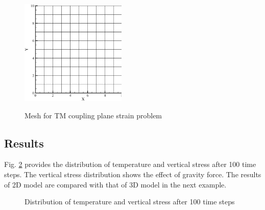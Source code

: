\begin{figure}[!htbp]
\centering
\includegraphics[height=5cm]{PART_III/TM/figures/2D_mesh}\\
\caption{Mesh for TM coupling plane strain problem }
\label{fig:TM2Mesh}
\end{figure}




\subsection{Results}
Fig. \ref{fig_TM1_r} provides the distribution of temperature and vertical stress after 100 time steps. The vertical stress distribution shows the effect of gravity force. The results of 2D model are compared with that of 3D model in the next example.

\begin{figure}[!htbp]
\begin{center}
\end{center}
\caption{Distribution of temperature and vertical stress after 100 time steps}
\label{fig_TM1_r}
\end{figure}

